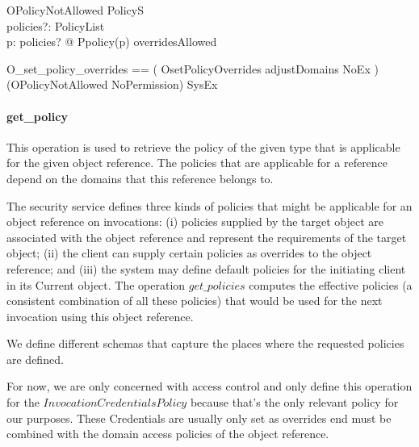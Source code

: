 \begin{schema}{OPolicyNotAllowed}
  \Xi PolicyS \\
  policies?: PolicyList \\
  \where
  \exists p: \ran policies? @ Ppolicy(p) \notin overridesAllowed \\
\end{schema}
\begin{zed}
  O\_set\_policy\_overrides == \< ( OsetPolicyOverrides \land adjustDomains \land
  NoEx ) \lor \\
  (OPolicyNotAllowed \land NoPermission) \lor SysEx \>
\end{zed}


\paragraph{get\_policy}
This operation is used to retrieve the policy of the given type that is
applicable for the given object reference.  The policies that are applicable for
a reference depend on the domains that this reference belongs to.  


The security service defines three kinds of policies that might be applicable
for an object reference on invocations: (i) policies supplied by the target
object are associated with the object reference and represent the requirements
of the target object; (ii) the client can supply certain policies as overrides
to the object reference; and (iii) the system may define default policies for
the initiating client in its Current object.  The operation $get\_policies$
computes the effective policies (a consistent combination of all these policies)
that would be used for the next invocation using this object reference.


We define different schemas that capture the places where the requested policies
are defined.

For now, we are only concerned with access control and only define this
operation for the $InvocationCredentialsPolicy$ because that's the only relevant
policy for our purposes.  These Credentials are usually only set as overrides
end must be combined with the domain access policies of the object reference.

